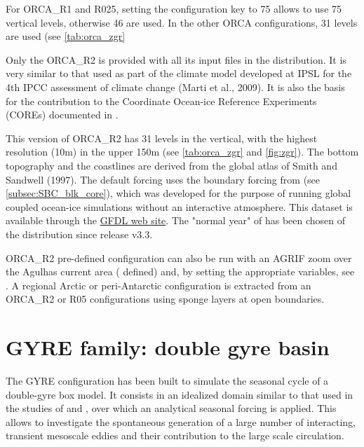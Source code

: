 \documentclass[../main/NEMO_manual]{subfiles}
\begin{document}
For ORCA\_R1 and R025, setting the configuration key to 75 allows to use 75 vertical levels, otherwise 46 are used.
In the other ORCA configurations, 31 levels are used
(see \autoref{tab:orca_zgr} %

Only the ORCA\_R2 is provided with all its input files in the \NEMO distribution.
It is very similar to that used as part of the climate model developed at IPSL for the 4th IPCC assessment of
climate change (Marti et al., 2009).
It is also the basis for the \NEMO contribution to the Coordinate Ocean-ice Reference Experiments (COREs)
documented in \citet{Griffies_al_OM09}. 

This version of ORCA\_R2 has 31 levels in the vertical, with the highest resolution (10m) in the upper 150m
(see \autoref{tab:orca_zgr} and \autoref{fig:zgr}). 
The bottom topography and the coastlines are derived from the global atlas of Smith and Sandwell (1997). 
The default forcing uses the boundary forcing from \citet{Large_Yeager_Rep04} (see \autoref{subsec:SBC_blk_core}), 
which was developed for the purpose of running global coupled ocean-ice simulations without
an interactive atmosphere.
This \citet{Large_Yeager_Rep04} dataset is available through
the \href{http://nomads.gfdl.noaa.gov/nomads/forms/mom4/CORE.html}{GFDL web site}.
The "normal year" of \citet{Large_Yeager_Rep04} has been chosen of the \NEMO distribution since release v3.3. 

ORCA\_R2 pre-defined configuration can also be run with an AGRIF zoom over the Agulhas current area
( defined) and, by setting the appropriate variables, see .
A regional Arctic or peri-Antarctic configuration is extracted from an ORCA\_R2 or R05 configurations using
sponge layers at open boundaries. 

\section{GYRE family: double gyre basin }
\label{sec:CFG_gyre}

The GYRE configuration \citep{Levy_al_OM10} has been built to
simulate the seasonal cycle of a double-gyre box model.
It consists in an idealized domain similar to that used in the studies of \citet{Drijfhout_JPO94} and
\citet{Hazeleger_Drijfhout_JPO98, Hazeleger_Drijfhout_JPO99, Hazeleger_Drijfhout_JGR00, Hazeleger_Drijfhout_JPO00},
over which an analytical seasonal forcing is applied.
This allows to investigate the spontaneous generation of a large number of interacting, transient mesoscale eddies 
and their contribution to the large scale circulation. 
\end{document}
